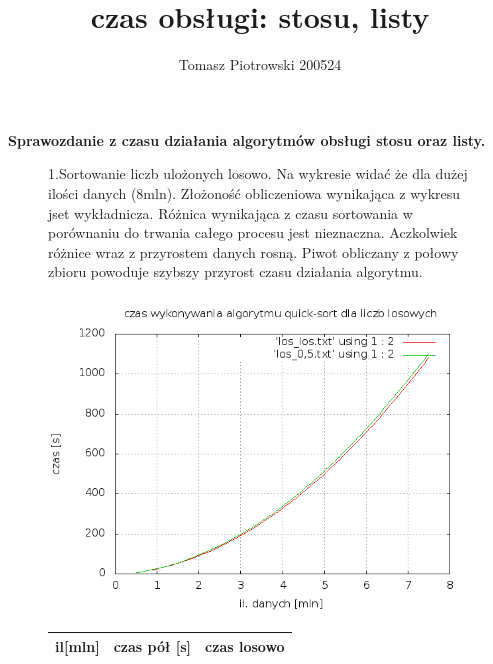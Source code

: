 \documentclass[a4paper,11pt]{report}
\title{czas obsługi: stosu, listy}
\author{Tomasz Piotrowski 200524}
\begin{document}
\maketitle

\textbf {\Large{ Sprawozdanie z czasu działania algorytmów  obsługi stosu oraz listy. }}



\begin{figure}
  \begin{center}

  1.Sortowanie liczb ulożonych losowo. Na wykresie widać że dla dużej ilości danych (8mln). Złożoność obliczeniowa wynikająca z wykresu jset wykładnicza. Różnica wynikająca z czasu sortowania w porównaniu do trwania całego procesu jest nieznaczna. Aczkolwiek różnice wraz z przyrostem danych rosną. Piwot obliczany z połowy zbioru powoduje szybszy przyrost czasu działania algorytmu.
  
    \includegraphics[scale=0.5]{./czas_losowe.png}
    \label{fig:}
    \caption{}
          \begin{tabular}{|l|c|r|}
\hline
il[mln] & czas pół [s] & czas losowo \\
\hline


\end{tabular}
\end{center}
\end{figure}
\end{document}
